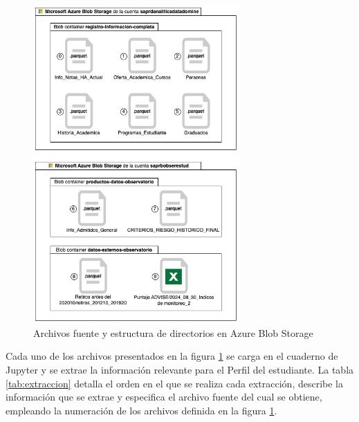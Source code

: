 \begin{figure}[h]
	\centering
	\includegraphics[width=0.7\textwidth]{assets/blob_storage.jpg}
	\caption{Archivos fuente y estructura de directorios en \gls{Azure Blob Storage}}
	\label{fig:blob_storage}
\end{figure}

Cada uno de los archivos presentados en la figura \ref{fig:blob_storage} se carga en el cuaderno de \gls{Jupyter} y se extrae la información relevante para el Perfil del estudiante. La tabla \ref{tab:extraccion} detalla el orden en el que se realiza cada extracción, describe la información que se extrae y especifica el archivo fuente del cual se obtiene, empleando la numeración de los archivos definida en la figura \ref{fig:blob_storage}.

